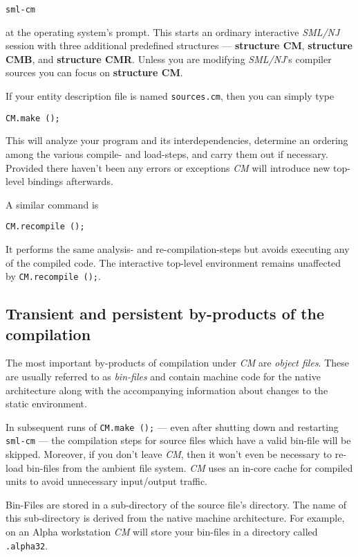 \begin{verbatim}
sml-cm
\end{verbatim}

at the operating system's prompt.  This starts an ordinary interactive {\em
SML/NJ} session with three additional predefined structures --- {\bf
structure CM}, {\bf structure CMB}, and {\bf structure CMR}.  Unless you
are modifying {\em SML/NJ}\/'s compiler sources you can focus on {\bf
structure CM}.

If your entity description file is named {\tt sources.cm}, then you
can simply type

\begin{verbatim}
CM.make ();
\end{verbatim}

This will analyze your program and its interdependencies, determine an
ordering among the various compile- and load-steps, and carry them out if
necessary.  Provided there haven't been any errors or exceptions {\em CM}
will introduce new top-level bindings afterwards.

A similar command is

\begin{verbatim}
CM.recompile ();
\end{verbatim}

It performs the same analysis- and re-compilation-steps but avoids
executing any of the compiled code.  The interactive top-level environment
remains unaffected by {\tt CM.recompile ();}.

\subsection{Transient and persistent by-products of the compilation}

The most important by-products of compilation under {\em CM} are {\em
object files}.  These are usually referred to as {\em bin-files} and
contain machine code for the native architecture along with the
accompanying information about changes to the static environment.

In subsequent runs of {\tt CM.make ();} --- even after shutting down and
restarting {\tt sml-cm} --- the compilation steps for source files which
have a valid bin-file will be skipped.  Moreover, if you don't leave {\em
CM}, then it won't even be necessary to re-load bin-files from the ambient
file system.  {\em CM} uses an in-core cache for compiled units to avoid
unnecessary input/output traffic.

Bin-Files are stored in a sub-directory of the source file's directory.
The name of this sub-directory is derived from the native machine
architecture.  For example, on an Alpha workstation {\em CM} will store
your bin-files in a directory called {\tt .alpha32}.

